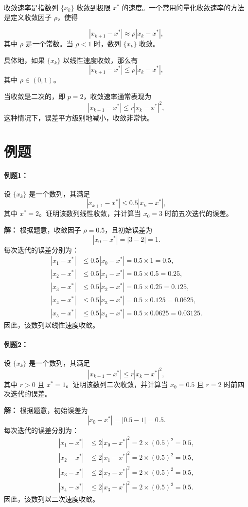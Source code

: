 收敛速率是指数列 $\{x_k\}$ 收敛到极限 $x^*$ 的速度。一个常用的量化收敛速率的方法是定义收敛因子 $\rho$，使得

\[
|x_{k+1} - x^*| \approx \rho |x_k - x^*|,
\]
其中 $\rho$ 是一个常数。当 $\rho < 1$ 时，数列 $\{x_k\}$ 收敛。

具体地，如果 $\{x_k\}$ 以线性速度收敛，那么有
\[
|x_{k+1} - x^*| \leq \rho |x_k - x^*|,
\]
其中 $\rho \in (0, 1)$。

当收敛是二次的，即 $p = 2$，收敛速率通常表现为
\[
|x_{k+1} - x^*| \leq r |x_k - x^*|^2,
\]
这种情况下，误差平方级别地减小，收敛非常快。

\section*{例题}

\paragraph{例题1：}
设 $\{x_k\}$ 是一个数列，其满足
\[
|x_{k+1} - x^*| \leq 0.5 |x_k - x^*|,
\]
其中 $x^* = 2$。证明该数列线性收敛，并计算当 $x_0 = 3$ 时前五次迭代的误差。

\textbf{解：}
根据题意，收敛因子 $\rho = 0.5$，且初始误差为
\[
|x_0 - x^*| = |3 - 2| = 1.
\]
每次迭代的误差分别为：
\[
\begin{aligned}
|x_1 - x^*| &\leq 0.5 |x_0 - x^*| = 0.5 \times 1 = 0.5, \\
|x_2 - x^*| &\leq 0.5 |x_1 - x^*| = 0.5 \times 0.5 = 0.25, \\
|x_3 - x^*| &\leq 0.5 |x_2 - x^*| = 0.5 \times 0.25 = 0.125, \\
|x_4 - x^*| &\leq 0.5 |x_3 - x^*| = 0.5 \times 0.125 = 0.0625, \\
|x_5 - x^*| &\leq 0.5 |x_4 - x^*| = 0.5 \times 0.0625 = 0.03125.
\end{aligned}
\]
因此，该数列以线性速度收敛。

\paragraph{例题2：}
设 $\{x_k\}$ 是一个数列，其满足
\[
|x_{k+1} - x^*| \leq r |x_k - x^*|^2,
\]
其中 $r > 0$ 且 $x^* = 1$。证明该数列二次收敛，并计算当 $x_0 = 0.5$ 且 $r = 2$ 时前四次迭代的误差。

\textbf{解：}
根据题意，初始误差为
\[
|x_0 - x^*| = |0.5 - 1| = 0.5.
\]
每次迭代的误差分别为：
\[
\begin{aligned}
|x_1 - x^*| &\leq 2 |x_0 - x^*|^2 = 2 \times (0.5)^2 = 0.5, \\
|x_2 - x^*| &\leq 2 |x_1 - x^*|^2 = 2 \times (0.5)^2 = 0.5, \\
|x_3 - x^*| &\leq 2 |x_2 - x^*|^2 = 2 \times (0.5)^2 = 0.5, \\
|x_4 - x^*| &\leq 2 |x_3 - x^*|^2 = 2 \times (0.5)^2 = 0.5.
\end{aligned}
\]
因此，该数列以二次速度收敛。

